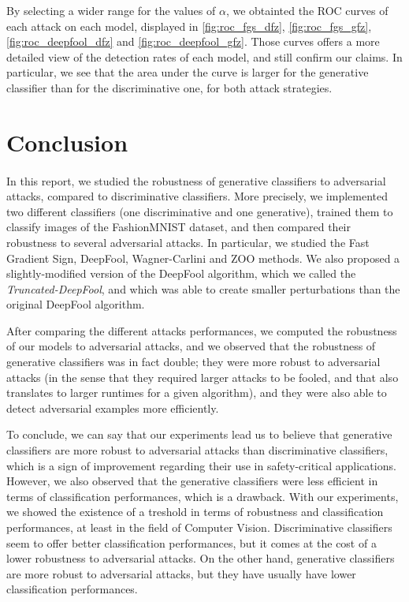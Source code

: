 \documentclass[10pt,twocolumn,letterpaper]{article}
\begin{document}
By selecting a wider range for the values of $\alpha$, we obtainted the ROC curves of each attack on each model, displayed in \cref{fig:roc_fgs_dfz}, \cref{fig:roc_fgs_gfz}, \cref{fig:roc_deepfool_dfz} and \cref{fig:roc_deepfool_gfz}. Those curves offers a more detailed view of the detection rates of each model, and still confirm our claims. In particular, we see that the area under the curve is larger for the generative classifier than for the discriminative one, for both attack strategies.


\section{Conclusion}
\label{sec:conclusion}

\paragraph{} In this report, we studied the robustness of generative classifiers to adversarial attacks, compared to discriminative classifiers. More precisely, we implemented two different classifiers (one discriminative and one generative), trained them to classify images of the FashionMNIST dataset, and then compared their robustness to several adversarial attacks. In particular, we studied the Fast Gradient Sign, DeepFool, Wagner-Carlini and ZOO methods. We also proposed a slightly-modified version of the DeepFool algorithm, which we called the \textit{Truncated-DeepFool}, and which was able to create smaller perturbations than the original DeepFool algorithm.

After comparing the different attacks performances, we computed the robustness of our models to adversarial attacks, and we observed that the robustness of generative classifiers was in fact double; they were more robust to adversarial attacks (in the sense that they required larger attacks to be fooled, and that also translates to larger runtimes for a given algorithm), and they were also able to detect adversarial examples more efficiently.

To conclude, we can say that our experiments lead us to believe that generative classifiers are more robust to adversarial attacks than discriminative classifiers, which is a sign of improvement regarding their use in safety-critical applications. However, we also observed that the generative classifiers were less efficient in terms of classification performances, which is a drawback. With our experiments, we showed the existence of a treshold in terms of robustness and classification performances, at least in the field of Computer Vision. Discriminative classifiers seem to offer better classification performances, but it comes at the cost of a lower robustness to adversarial attacks. On the other hand, generative classifiers are more robust to adversarial attacks, but they have usually have lower classification performances. 
\end{document}
